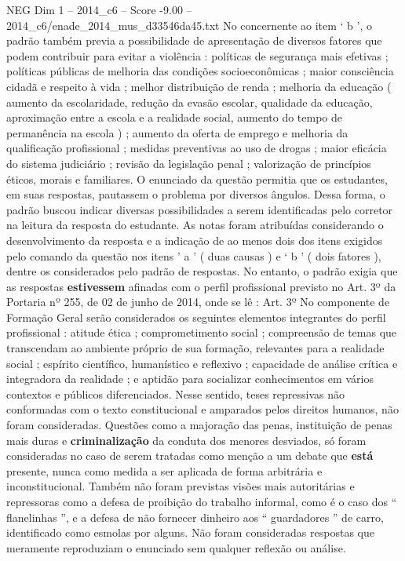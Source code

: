 \begin{textsample}{NEG Dim 1 – 2014\_c6 – Score -9.00 – 2014\_c6/enade\_2014\_mus\_d33546da45.txt}
No concernente ao item ‘ b ’, o padrão também previa a possibilidade de apresentação de diversos fatores que podem contribuir para evitar a violência : políticas de segurança mais efetivas ; políticas públicas de melhoria das condições socioeconômicas ; maior consciência cidadã e respeito à vida ; melhor distribuição de renda ; melhoria da educação ( aumento da escolaridade, redução da evasão escolar, qualidade da educação, aproximação entre a escola e a realidade social, aumento do tempo de permanência na escola ) ; aumento da oferta de emprego e melhoria da qualificação profissional ; medidas preventivas ao uso de drogas ; maior eficácia do sistema judiciário ; revisão da legislação penal ; valorização de princípios éticos, morais e familiares.
O enunciado da questão permitia que os estudantes, em suas respostas, pautassem o problema por diversos ângulos.
Dessa forma, o padrão buscou indicar diversas possibilidades a serem identificadas pelo corretor na leitura da resposta do estudante.
As notas foram atribuídas considerando o desenvolvimento da resposta e a indicação de ao menos dois dos itens exigidos pelo comando da questão nos itens ’ a ’ ( duas causas ) e ‘ b ’ ( dois fatores ), dentre os considerados pelo padrão de respostas.
No entanto, o padrão exigia que as respostas \textbf{estivessem} afinadas com o perfil profissional previsto no Art. 3º da Portaria nº 255, de 02 de junho de 2014, onde se lê : Art. 3º No componente de Formação Geral serão considerados os seguintes elementos integrantes do perfil profissional : atitude ética ; comprometimento social ; compreensão de temas que transcendam ao ambiente próprio de sua formação, relevantes para a realidade social ; espírito científico, humanístico e reflexivo ; capacidade de análise crítica e integradora da realidade ; e aptidão para socializar conhecimentos em vários contextos e públicos diferenciados.
Nesse sentido, teses repressivas não conformadas com o texto constitucional e amparados pelos direitos humanos, não foram consideradas.
Questões como a majoração das penas, instituição de penas mais duras e \textbf{criminalização} da conduta dos menores desviados, só foram consideradas no caso de serem tratadas como menção a um debate que \textbf{está} presente, nunca como medida a ser aplicada de forma arbitrária e inconstitucional.
Também não foram previstas visões mais autoritárias e repressoras como a defesa de proibição do trabalho informal, como é o caso dos “ flanelinhas ”, e a defesa de não fornecer dinheiro aos “ guardadores ” de carro, identificado como esmolas por alguns.
Não foram consideradas respostas que meramente reproduziam o enunciado sem qualquer reflexão ou análise.

\end{textsample}
